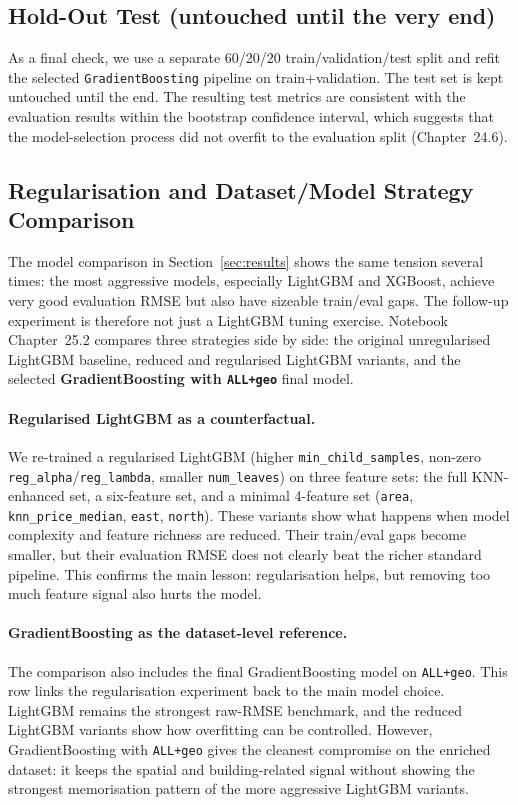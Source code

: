 \documentclass[11pt,a4paper]{article}
\begin{document}
\subsection{Hold-Out Test (untouched until the very end)}
As a final check, we use a separate 60/20/20 train/validation/test split and refit the selected \texttt{GradientBoosting} pipeline on train+validation. The test set is kept untouched until the end. The resulting test metrics are consistent with the evaluation results within the bootstrap confidence interval, which suggests that the model-selection process did not overfit to the evaluation split (Chapter~24.6).

\subsection{Regularisation and Dataset/Model Strategy Comparison}
\label{sec:regularised}
The model comparison in Section~\ref{sec:results} shows the same tension several times: the most aggressive models, especially LightGBM and XGBoost, achieve very good evaluation RMSE but also have sizeable train/eval gaps. The follow-up experiment is therefore not just a LightGBM tuning exercise. Notebook Chapter~25.2 compares three strategies side by side: the original unregularised LightGBM baseline, reduced and regularised LightGBM variants, and the selected \textbf{GradientBoosting with \texttt{ALL+geo}} final model.

\paragraph{Regularised LightGBM as a counterfactual.}
We re-trained a regularised LightGBM (higher \texttt{min\_child\_samples}, non-zero \texttt{reg\_alpha}/\texttt{reg\_lambda}, smaller \texttt{num\_leaves}) on three feature sets: the full KNN-enhanced set, a six-feature set, and a minimal 4-feature set (\texttt{area}, \texttt{knn\_price\_median}, \texttt{east}, \texttt{north}). These variants show what happens when model complexity and feature richness are reduced. Their train/eval gaps become smaller, but their evaluation RMSE does not clearly beat the richer standard pipeline. This confirms the main lesson: regularisation helps, but removing too much feature signal also hurts the model.

\paragraph{GradientBoosting as the dataset-level reference.}
The comparison also includes the final GradientBoosting model on \texttt{ALL+geo}. This row links the regularisation experiment back to the main model choice. LightGBM remains the strongest raw-RMSE benchmark, and the reduced LightGBM variants show how overfitting can be controlled. However, GradientBoosting with \texttt{ALL+geo} gives the cleanest compromise on the enriched dataset: it keeps the spatial and building-related signal without showing the strongest memorisation pattern of the more aggressive LightGBM variants.
\end{document}
